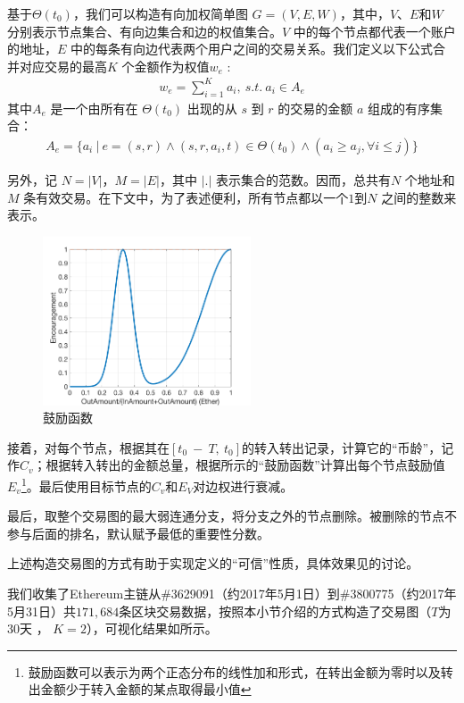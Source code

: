 基于$\Theta(t_0)$，我们可以构造有向加权简单图 $G = (V, E, W)$，其中，$V$、$E$和$W$ 分别表示节点集合、有向边集合和边的权值集合。$V$ 中的每个节点都代表一个账户的地址，$E$ 中的每条有向边代表两个用户之间的交易关系。我们定义以下公式合并对应交易的最高$K$ 个金额作为权值$w_e$ :
\begin{align}\label{formula:edgeweight}
w_e = \sum_{i=1}^K a_i,\ s.t.\ a_i \in A_e
\end{align}
其中$A_e$ 是一个由所有在 $\Theta(t_0)$ 出现的从 $s$ 到 $r$ 的交易的金额 $a$ 组成的有序集合：
\begin{align}
A_e = \{a_i\ |\ e = (s,r) \land (s, r, a_i, t) \in \Theta(t_0) \land (a_i \ge a_j, \forall i \le j) \}
\end{align}

另外，记 $N = |V|$，$M = |E|$，其中 $|.|$ 表示集合的范数。因而，总共有$N$ 个地址和$M$ 条有效交易。在下文中，为了表述便利，所有节点都以一个$1$到$N$ 之间的整数来表示。

\begin{figure}[h]
\centering
	\includegraphics[width=0.55\textwidth]{figs/encouragement_en.png}
	\caption{鼓励函数}\label{fig:encouragement}
\end{figure}

接着，对每个节点，根据其在$[t_0\ −\ T,\ t_0]$的转入转出记录，计算它的“币龄”，记作$C_v$；根据转入转出的金额总量，根据所示的“鼓励函数”计算出每个节点鼓励值$E_v$\footnote{鼓励函数可以表示为两个正态分布的线性加和形式，在转出金额为零时以及转出金额少于转入金额的某点取得最小值}。最后使用目标节点的$C_v$和$E_V$对边权进行衰减。

最后，取整个交易图的最大弱连通分支，将分支之外的节点删除。被删除的节点不参与后面的排名，默认赋予最低的重要性分数。

上述构造交易图的方式有助于实现定义的“可信”性质，具体效果见的讨论。

我们收集了Ethereum主链从\#3629091（约2017年5月1日）到\#3800775（约2017年5月31日）共$171,684$条区块交易数据，按照本小节介绍的方式构造了交易图（$T$为30天 ， $K=2$），可视化结果如所示。

